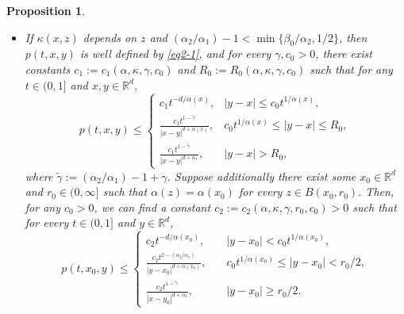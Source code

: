 \documentclass[a4paper,11pt]{amsart}
\renewcommand{\le}{\leqslant}
\renewcommand{\ge}{\geqslant}
\newcommand{\R}{\mathds R}
\newcommand{\B}{\beta}
\newcommand{\K}{\kappa}
\newcommand{\A}{\alpha}
\newcommand{\G}{\gamma}
\newtheorem{proposition}[theorem]{Proposition}
\theoremstyle{definition}
\begin{document}
\begin{proposition}
\begin{itemize}
\item[(2)] If $\K(x,z)$ depends on $z$ and $({\A_2}/{\A_1})-1<\min\{{\B_0}/{\A_2},1/2\}$, then $p(t,x,y)$ is well defined by
\eqref{eq2-1}, and for every $\gamma, c_0>0$, there exist constants
$c_1:=c_1(\A,\K,\G,c_0)$ and $R_0:=R_0(\A,\K,\G,c_0)$ such that for any $t\in (0,1]$ and $x,y\in \R^d$,
\begin{equation}\label{p3-2-1a}
p(t,x,y)\le
\begin{cases}c_1t^{-{d/\A(x)}}, & |y-x|\le c_0 t^{{1/\A(x)}},\\
\frac{c_1t^{1-\tilde\G}}{|x-y|^{d+\A(x)}},& c_0 t^{{1/\A(x)}}\le |y-x|\le R_0,\\
\frac{c_1t^{1-\tilde\G }}{|x-y|^{d+\A_1}},&|y-x|> R_0,
\end{cases}
\end{equation}
where $\tilde\G:=({\A_2}/{\A_1})-1+\G$. Suppose additionally there exist some
$x_0 \in \R^d$ and $r_0\in(0,\infty]$ such that $\alpha(z)=\alpha(x_0)$ for
every $z \in B(x_0,r_0)$. Then, for any $c_0>0$, we can find a constant
$c_2:=c_2(\A,\K,\G,r_0,c_0)>0$ such that for every $t\in (0,1]$ and $y \in \R^d$,
\begin{equation}\label{p3-2-2a}
p(t,x_0,y)\le
\begin{cases}
{c_2}{t^{-{d/\A (x_0)}}},&\quad |y-x_0|< c_0t^{{1/\A(x_0)}},\\
\frac{c_2 t^{2-{(\A_2/\A_1)}} }{|y-x_0|^{d+\A(x_0)}},& \quad
c_0t^{{1/\A(x_0)}}\le |y-x_0|< {r_0}/{2},\\
\frac{c_2 t^{1-\tilde\G} }{|x-y_0|^{d+\A_1}},&\quad |y-x_0|\ge
{r_0}/{2}.
\end{cases}
\end{equation}
\end{itemize}
\end{proposition}
\end{document}
